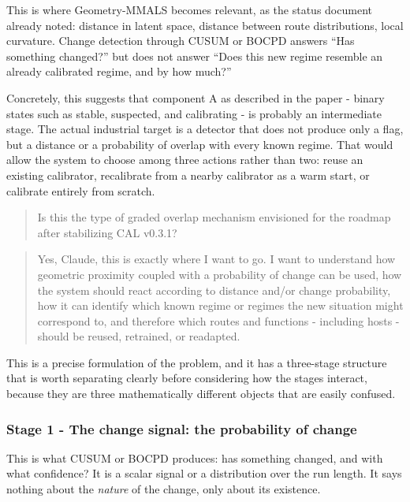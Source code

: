 This is where Geometry-MMALS becomes relevant, as the status document already noted: distance in latent space, distance between route distributions, local curvature. Change detection through CUSUM or BOCPD answers ``Has something changed?'' but does not answer ``Does this new regime resemble an already calibrated regime, and by how much?''

Concretely, this suggests that component A as described in the paper - binary states such as stable, suspected, and calibrating - is probably an intermediate stage. The actual industrial target is a detector that does not produce only a flag, but a distance or a probability of overlap with every known regime. That would allow the system to choose among three actions rather than two: reuse an existing calibrator, recalibrate from a nearby calibrator as a warm start, or calibrate entirely from scratch.

\begin{quote}
Is this the type of graded overlap mechanism envisioned for the roadmap after stabilizing CAL v0.3.1?
\end{quote}

\begin{quote}
Yes, Claude, this is exactly where I want to go. I want to understand how geometric proximity coupled with a probability of change can be used, how the system should react according to distance and/or change probability, how it can identify which known regime or regimes the new situation might correspond to, and therefore which routes and functions - including hosts - should be reused, retrained, or readapted.
\end{quote}

This is a precise formulation of the problem, and it has a three-stage structure that is worth separating clearly before considering how the stages interact, because they are three mathematically different objects that are easily confused.

\subsubsection{Stage 1 - The change signal: the probability of change}\label{stage-1---the-change-signal-the-probability-of-change}

This is what CUSUM or BOCPD produces: has something changed, and with what confidence? It is a scalar signal or a distribution over the run length. It says nothing about the \emph{nature} of the change, only about its existence.

